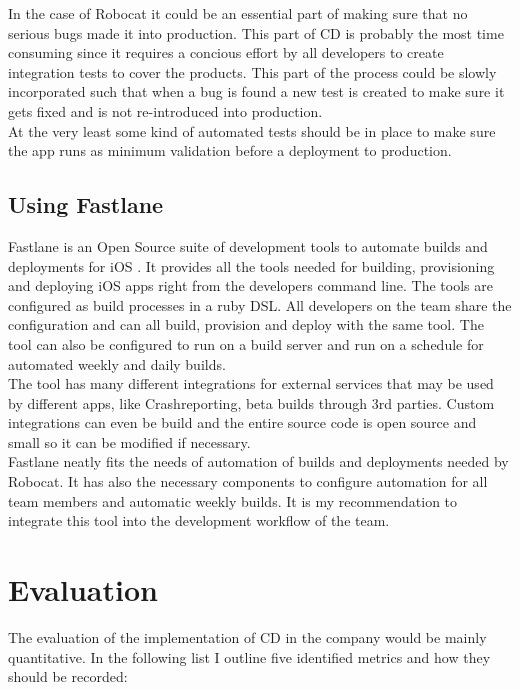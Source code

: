 \documentclass{ituthesis}
\begin{document}
In the case of Robocat it could be an essential part of making sure that no serious bugs made it into production. This part of CD is probably the most time consuming since it requires a concious effort by all developers to create integration tests to cover the products. This part of the process could be slowly incorporated such that when a bug is found a new test is created to make sure it gets fixed and is not re-introduced into production.\\

At the very least some kind of automated tests should be in place to make sure the app runs as minimum validation before a deployment to production.

\section{Using Fastlane}
\label{sec:using_fastlane}

Fastlane is an Open Source suite of development tools to automate builds and deployments for iOS \cite{Krause2015}. It provides all the tools needed for building, provisioning and deploying iOS apps right from the developers command line. The tools are configured as build processes in a ruby DSL. All developers on the team share the configuration and can all build, provision and deploy with the same tool. The tool can also be configured to run on a build server and run on a schedule for automated weekly and daily builds.\\

The tool has many different integrations for external services that may be used by different apps, like Crashreporting, beta builds through 3rd parties. Custom integrations can even be build and the entire source code is open source and small so it can be modified if necessary.\\

Fastlane neatly fits the needs of automation of builds and deployments needed by Robocat. It has also the necessary components to configure automation for all team members and automatic weekly builds. It is my recommendation to integrate this tool into the development workflow of the team.

\chapter{Evaluation}
\label{ch:evaluation}

The evaluation of the implementation of CD in the company would be mainly quantitative. In the following list I outline five identified metrics and how they should be recorded:
\end{document}
